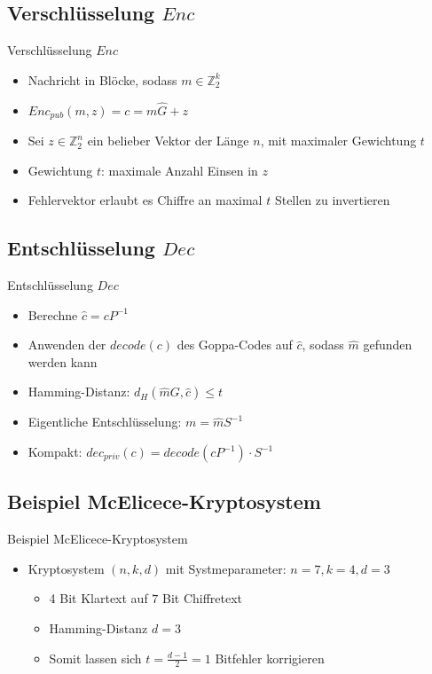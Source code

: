 \documentclass[11pt%
,aspectratio=169%
]{beamer}
\begin{document}
\subsection{Verschlüsselung $Enc$}
\begin{frame}{Verschlüsselung $Enc$}
    \begin{itemize}
        \item Nachricht in Blöcke, sodass $m \in \mathbb{Z}_2^k$
        \item $Enc_{pub}(m,z) = c = m\hat{G} + z$
        \item Sei $z \in \mathbb{Z}_2^n$ ein belieber Vektor der Länge $n$, mit maximaler Gewichtung $t$
        \item Gewichtung $t$: maximale Anzahl Einsen in $z$
        \item Fehlervektor erlaubt es Chiffre an maximal $t$ Stellen zu invertieren
    \end{itemize}
\end{frame}
    
\subsection{Entschlüsselung $Dec$}
\begin{frame}{Entschlüsselung $Dec$}
    \begin{itemize}
        \item Berechne $\hat{c} = cP^{-1}$
        \item Anwenden der $decode(c)$ des Goppa-Codes auf $\hat{c}$, sodass $\hat{m}$ gefunden werden kann
        \item Hamming-Distanz: $d_H(\hat{m}G, \hat{c}) \leq t$
        \item Eigentliche Entschlüsselung: $m = \hat{m}S^{-1}$
        \item Kompakt: $dec_{priv}(c) = decode(cP^{-1}) \cdot S^{-1}$
    \end{itemize}    
\end{frame}

\subsection{Beispiel McElicece-Kryptosystem}
\begin{frame}{Beispiel McElicece-Kryptosystem}
    \begin{itemize}
        \item Kryptosystem $(n,k,d)$ mit Systmeparameter: $n=7, k=4, d=3$
        \begin{itemize}
            \item 4 Bit Klartext auf $7$ Bit Chiffretext
            \item Hamming-Distanz $d=3$
            \item Somit lassen sich $t = \frac{d-1}{2} = 1$ Bitfehler korrigieren
        \end{itemize}
    \end{itemize}
\end{frame}
\end{document}
